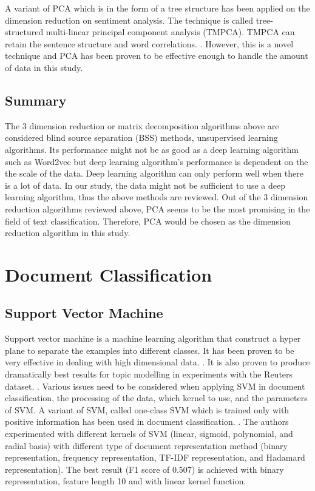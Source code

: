 A variant of PCA which is in the form of a tree structure has been applied on the dimension reduction on sentiment analysis. The technique is called tree-structured multi-linear principal component analysis (TMPCA). TMPCA can retain the sentence structure and word correlations. \cite{treePca}. However, this is a novel technique and PCA has been proven to be effective enough to handle the amount of data in this study.
	
\subsection{Summary}
The 3 dimension reduction or matrix decomposition algorithms above are considered blind source separation (BSS) methods, unsupervised learning algorithms. Its performance might not be as good as a deep learning algorithm such as Word2vec but deep learning algorithm's performance is dependent on the the scale of the data. Deep learning algorithm can only perform well when there is a lot of data. In our study, the data might not be sufficient to use a deep learning algorithm, thus the above methods are reviewed. Out of the 3 dimension reduction algorithms reviewed above, PCA seems to be the most promising in the field of text classification. Therefore, PCA would be chosen as the dimension reduction algorithm in this study.
	
\section{Document Classification}
\subsection{Support Vector Machine}
Support vector machine is a machine learning algorithm that construct a hyper plane to separate the examples into different classes. It has been proven to be very effective in dealing with high dimensional data. \cite{webSvm}. It is also proven to produce dramatically best results for topic modelling in experiments with the Reuters dataset. \cite{inductiveText}. Various issues need to be considered when applying SVM in document classification, the processing of the data, which kernel to use, and the parameters of SVM. A variant of SVM, called one-class SVM which is trained only with positive information has been used in document classification. \cite{oneSvm}.  The authors experimented with different kernels of SVM (linear, sigmoid, polynomial, and radial basis) with different type of document representation method (binary representation, frequency representation, TF-IDF representation, and Hadamard representation). The best result (F1 score of 0.507) is achieved with binary representation, feature length 10 and with linear kernel function.  
	
